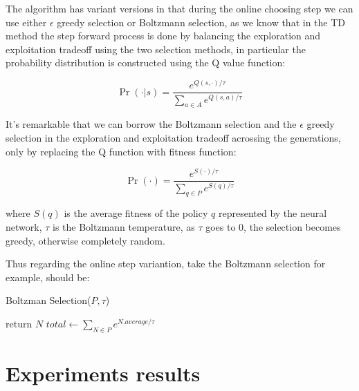 \documentclass{article}
\begin{document}
The algorithm has variant versions in that during the online choosing step we can use either $\epsilon$ greedy selection or Boltzmann selection, as we know that 
in the TD method the step forward process is done by balancing the exploration and exploitation tradeoff using the two selection methods, in particular the 
probability distribution is constructed using the Q value function:

  $$\Pr(\cdot| s) = \frac{e^{Q(s,\cdot)/\tau}}{\sum_{a\in A} e^{Q(s,a)/\tau}}$$

It's remarkable that we can borrow the Boltzmann selection and the $\epsilon$ greedy selection in the exploration and exploitation tradeoff acrossing the generations,
only by replacing the Q function with fitness function:

  $$\Pr(\cdot) = \frac{e^{S(\cdot)/\tau}}{\sum_{q\in P} e^{S(q)/\tau}}$$

  where $S(q)$ is the average fitness of the policy $q$ represented by the neural network, $\tau$ is the Boltzmann temperature, as $\tau$ goes to 0,
  the selection becomes greedy, otherwise completely random.

Thus regarding the online step variantion, take the Boltzmann selection for example, should be:
\begin{algorithm}[H]
  {\tiny\caption{Boltzman Selection($P, \tau$)}}
    {return $N$}
    {$total \leftarrow \sum_{N \in P} e^{N.average / \tau}$\;
    }
  \end{algorithm}

\section{Experiments results}
\end{document}
